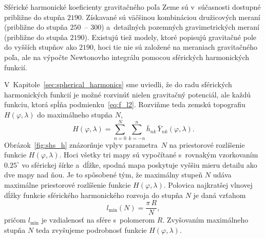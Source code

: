 \documentclass[a4paper, 12pt]{book}
\begin{document}
Sférické harmonické koeficienty gravitačného poľa Zeme sú v~súčasnosti dostupné
približne do stupňa $2190$.  Získavané sú väčšinou kombináciou družicových
meraní (približne do stupňa $250$~-- $300$) a~detailných pozemných
gravimetrických meraní (približne do stupňa $2190$).  Existujú tiež modely,
ktoré popisujú gravitačné pole do vyšších stupňov ako $2190$, hoci tie nie sú
založené na meraniach gravitačného poľa, ale na výpočte Newtonovho integrálu
pomocou sférických harmonických funkcií.

V~Kapitole~\ref{sec:spherical_harmonics} sme uviedli, že do radu sférických
harmonických funkcií je možné rozvinúť nielen gravitačný potenciál, ale každú
funkciu, ktorá spĺňa podmienku~\ref{eq:f_l2}.  Rozviňme teda zemskú topografiu
$H(\varphi, \lambda)$ do maximálneho stupňa $N$,
%
\begin{equation}
\label{eq:h_shs}
H(\varphi, \lambda) = \sum_{n = 0}^{N} \sum_{k = -n}^n \bar{h}_{nk} \,
\bar{Y}_{nk}(\varphi, \lambda){.}
\end{equation}
%
Obrázok~\ref{fig:shs_h} znázorňuje vplyv parametra~$N$ na priestorové
rozlíšenie funkcie $H(\varphi, \lambda)$.  Hoci všetky tri mapy sú vypočítané
s~rovnakým vzorkovaním $0.25^{\circ}$ vo sférickej šírke a~dĺžke, spodná mapa
poskytuje vyššiu mieru detailu ako dve mapy nad ňou.  Je to spôsobené tým, že
maximálny stupeň $N$ udáva maximálne priestorové rozlíšenie funkcie
$H(\varphi,\lambda)$.  Polovica najkratšej vlnovej dĺžky funkcie sférického
harmonického rozvoja do stupňa $N$ je daná vzťahom
%
\begin{equation}
l_{\min}(N) = \frac{\pi \, R}{N}{,}
\end{equation}
%
pričom $l_{\min}$ je vzdialenosť na sfére s~polomerom $R$.  Zvyšovaním
maximálneho stupňa $N$ teda zvyšujeme podrobnosť funkcie $H(\varphi, \lambda)$.
\end{document}
